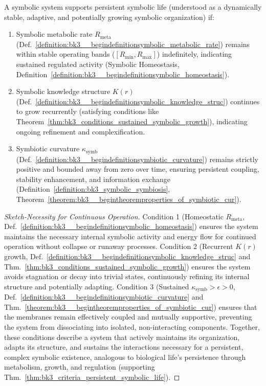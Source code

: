 \begin{theorem} \label{thm:bk3_criteria_persistent_symbolic_life}
A symbolic system supports persistent symbolic life (understood as a dynamically stable, adaptive, and potentially growing symbolic organization) if:
\begin{enumerate}
    \item Symbolic metabolic rate $R_{\text{meta}}$ (Def.~\ref{definition:bk3__begindefinitionsymbolic_metabolic_rate}) remains within stable operating bands ($[R_{\text{min}}, R_{\text{max}}]$) indefinitely, indicating sustained regulated activity (Symbolic Homeostasis, Definition~\ref{definition:bk3__begindefinitionsymbolic_homeostasis}).
    \item Symbolic knowledge structure $K(r)$ (Def.~\ref{definition:bk3__begindefinitionsymbolic_knowledge_struc}) continues to grow recurrently (satisfying conditions like Theorem~\ref{thm:bk3_conditions_sustained_symbolic_growth}), indicating ongoing refinement and complexification.
    \item Symbiotic curvature $\kappa_{\text{symb}}$ (Def.~\ref{definition:bk3__begindefinitionsymbiotic_curvature}) remains strictly positive and bounded away from zero over time, ensuring persistent coupling, stability enhancement, and information exchange (Definition~\ref{definition:bk3_symbolic_symbiosis}, Theorem~\ref{theorem:bk3__begintheoremproperties_of_symbiotic_cur}).
\end{enumerate}
\end{theorem}

\begin{proof}[Sketch-Necessity for Continuous Operation]
\label{proof:bk3_sketch_necessity_for_continuous_operation}
Condition 1 (Homeostatic $R_{\text{meta}}$, Def.~\ref{definition:bk3__begindefinitionsymbolic_homeostasis}) ensures the system maintains the necessary internal symbolic activity and energy flow for continued operation without collapse or runaway processes. Condition 2 (Recurrent $K(r)$ growth, Def.~\ref{definition:bk3__begindefinitionsymbolic_knowledge_struc} and Thm.~\ref{thm:bk3_conditions_sustained_symbolic_growth}) ensures the system avoids stagnation or decay into trivial states, continuously refining its internal structure and potentially adapting. Condition 3 (Sustained $\kappa_{\text{symb}} > \epsilon > 0$, Def.~\ref{definition:bk3__begindefinitionsymbiotic_curvature} and Thm.~\ref{theorem:bk3__begintheoremproperties_of_symbiotic_cur}) ensures that the membranes remain effectively coupled and mutually supportive, preventing the system from dissociating into isolated, non-interacting components. Together, these conditions describe a system that actively maintains its organization, adapts its structure, and sustains the interactions necessary for a persistent, complex symbolic existence, analogous to biological life's persistence through metabolism, growth, and regulation (supporting Thm.~\ref{thm:bk3_criteria_persistent_symbolic_life}).
\end{proof}

